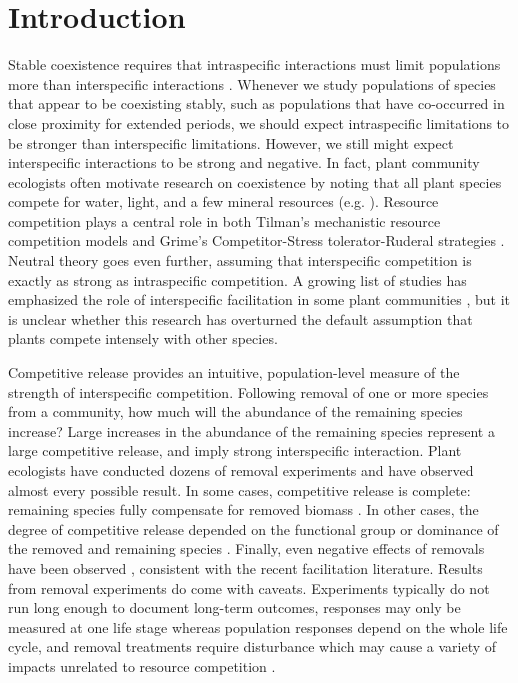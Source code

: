 \documentclass[11pt]{article}
\begin{document}
\begin{doublespacing}
\begin{enumerate}
\end{enumerate}


\section*{Introduction}

Stable coexistence requires that intraspecific interactions must limit populations more than interspecific interactions \citep{chesson_mechanisms_2000}.  Whenever we study populations of species that appear to be coexisting stably, such as populations that have co-occurred in close proximity for extended periods, we should expect intraspecific limitations to be stronger than interspecific limitations. However, we still might expect interspecific interactions to be strong and negative. In fact, plant community ecologists often motivate research on coexistence by noting that all plant species compete for water, light, and a few mineral resources (e.g. \citealt{silvertown_plant_2004}). Resource competition plays a central role in both Tilman's mechanistic resource competition models \citep{tilman_resource_1982} and Grime's Competitor-Stress tolerator-Ruderal strategies \citep{grime_plant_1979}. Neutral theory \citep{hubbell_unified_2001} goes even further, assuming that interspecific competition is exactly as strong as intraspecific competition. A growing list of studies has emphasized the role of interspecific facilitation in some plant communities \citep{he_global_2013,brooker_facilitation_2008}, but it is unclear whether this research has overturned the default assumption that plants compete intensely with other species.

Competitive release provides an intuitive, population-level measure of the strength of interspecific competition. Following removal of one or more species from a community, how much will the abundance of the remaining species increase? Large increases in the abundance of the remaining species represent a large competitive release, and imply strong interspecific interaction. Plant ecologists have conducted dozens of removal experiments and have observed almost every possible result. In some cases, competitive release is complete: remaining species fully compensate for removed biomass \citep{leps_nutrient_1999,jutila_effects_2002}. In other cases, the degree of competitive release depended on the functional group or dominance of the removed and remaining species \citep{smith_dominant_2003,sala_resource_1989,belsky_effects_1992}. Finally, even negative effects of removals have been observed \citep{keddy_effects_1989,gilbert_dominant_2009}, consistent with the recent facilitation literature. Results from removal experiments do come with caveats. Experiments typically do not run long enough to document long-term outcomes, responses may only be measured at one life stage whereas population responses depend on the whole life cycle, and removal treatments require disturbance which may cause a variety of impacts unrelated to resource competition \citep{aarssen_neighbour_1990}.


\end{doublespacing}
\end{document}
